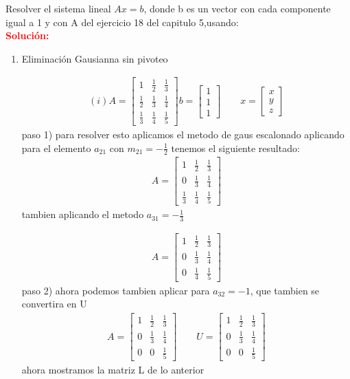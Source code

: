 Resolver el sistema lineal $Ax=b$, donde b es un vector con cada componente igual a 1 y con A del ejercicio 18 del capitulo 5,usando:\\

\renewcommand{\labelenumi}{\alph{enumi}}
\noindent \textcolor{red}{\bf Solución:}
\begin{enumerate}
\item Eliminación Gausianna sin pivoteo 


\begin{align*}
	(i) A =
\begin{bmatrix}
1 &\frac{1}{2} &\frac{1}{3} \\[6pt]
\frac{1}{2} &\frac{1}{3} &\frac{1}{4} \\[6pt]
\frac{1}{3} &\frac{1}{4} &\frac{1}{5} 
\end{bmatrix}
b = 
\begin{bmatrix}
1\\[6pt]
1\\[6pt]
1
\end{bmatrix}
\qquad
x =
\begin{bmatrix}
	x\\[6pt]
	y\\[6pt]
	z
\end{bmatrix}
\end{align*}
paso 1) para resolver esto aplicamos el metodo de gaus escalonado aplicando para el elemento $a_{21}$  con $m_{21} = -\frac{1}{2}$ tenemos el siguiente resultado:
\begin{align*}
A=
\begin{bmatrix}
1 &\frac{1}{2} &\frac{1}{3} \\[6pt]
0 &\frac{1}{3} &\frac{1}{4} \\[6pt]
\frac{1}{3} &\frac{1}{4} &\frac{1}{5} 
\end{bmatrix}
\end{align*}
tambien aplicando el metodo  $a_{31} = - \frac{1}{3}$

\begin{align*}
A=
\begin{bmatrix}
1 &\frac{1}{2} &\frac{1}{3} \\[6pt]
0 &\frac{1}{3} &\frac{1}{4} \\[6pt]
0 &\frac{1}{4} &\frac{1}{5} 
\end{bmatrix}
\end{align*}
paso 2) ahora podemos tambien aplicar para $a_{32} = -1$, que tambien se convertira en U
\begin{align*}
A=
\begin{bmatrix}
1 &\frac{1}{2} &\frac{1}{3} \\[6pt]
0 &\frac{1}{3} &\frac{1}{4} \\[6pt]
0 &0 &\frac{1}{5} 
\end{bmatrix}
\qquad U =
\begin{bmatrix}
1 &\frac{1}{2} &\frac{1}{3} \\[6pt]
0 &\frac{1}{3} &\frac{1}{4} \\[6pt]
0 &0 &\frac{1}{5} 
\end{bmatrix}
\end{align*}
ahora mostramos la matriz L de lo anterior


\end{enumerate}
